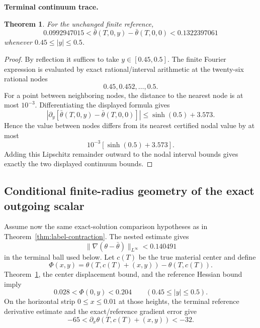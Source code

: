 \documentclass[11pt]{article}
\newtheorem{theorem}{Theorem}[section]\newtheorem{proposition}[theorem]{Proposition}
\theoremstyle{definition}\newtheorem{definition}[theorem]{Definition}\newtheorem{problem}[theorem]{Problem}
\theoremstyle{remark}\newtheorem{remark}[theorem]{Remark}
\begin{document}
\medskip
\noindent\textbf{Terminal continuum trace.}
\begin{theorem}\label{thm:terminal-trace}
For the unchanged finite reference,
\[
0.0992947015<\bar\theta(T,0,y)-\bar\theta(T,0,0)
<0.1322397061
\]
whenever $0.45\le|y|\le0.5$.
\end{theorem}
\begin{proof}
By reflection it suffices to take $y\in[0.45,0.5]$.  The finite Fourier expression is evaluated by exact rational/interval arithmetic at the twenty-six rational nodes
\[
0.45,0.452,\ldots,0.5.
\]
For a point between neighboring nodes, the distance to the nearest node is at most $10^{-3}$.  Differentiating the displayed formula gives
\[
\left|\partial_y[\bar\theta(T,0,y)-\bar\theta(T,0,0)]\right|
\le\sinh(0.5)+3.573.
\]
Hence the value between nodes differs from its nearest certified nodal value by at most
\[
10^{-3}[\sinh(0.5)+3.573].
\]
Adding this Lipschitz remainder outward to the nodal interval bounds gives exactly the two displayed continuum bounds.
\end{proof}

\subsection{Conditional finite-radius geometry of the exact outgoing scalar}
Assume now the same exact-solution comparison hypotheses as in Theorem~\ref{thm:label-contraction}.  The nested estimate gives
\[
\|\nabla(\theta-\bar\theta)\|_{L^\infty}<0.140491
\]
in the terminal ball used below.  Let $c(T)$ be the true material center and define
\[
\Phi(x,y)=\theta(T,c(T)+(x,y))-\theta(T,c(T)).
\]
Theorem~\ref{thm:terminal-trace}, the center displacement bound, and the reference Hessian bound imply
\[
0.028<\Phi(0,y)<0.204
\qquad(0.45\le|y|\le0.5).
\]
On the horizontal strip $0\le x\le0.01$ at those heights, the terminal reference derivative estimate and the exact/reference gradient error give
\[
-65<\partial_x\theta(T,c(T)+(x,y))<-32.
\]
\end{document}
